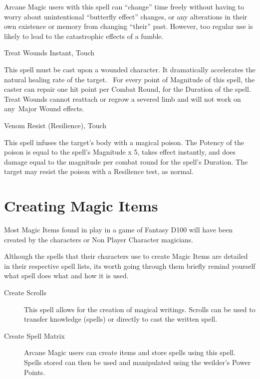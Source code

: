 \begin{samepage}
\begin{rpg-spell}
Arcane Magic users with this spell can “change” time freely without having to worry about unintentional “butterfly effect” changes, or any alterations in their own existence or memory from changing “their” past. However, too regular use is likely to lead to the catastrophic effects of a fumble.
\end{rpg-spell}
\end{samepage}


\begin{samepage}
\begin{rpg-spell}
{Treat Wounds}
{Instant, Touch}

This spell must be cast upon a wounded character. It dramatically accelerates the natural healing rate of the target.  For every point of Magnitude of this spell, the caster can repair one hit point per Combat Round, for the Duration of the spell. Treat Wounds cannot reattach or regrow a severed limb and will not work on any Major Wound effects. 
\end{rpg-spell}
\end{samepage}


\begin{samepage}
\begin{rpg-spell}
{Venom}
{Resist (Resilience), Touch}

This spell infuses the target’s body with a magical poison. The Potency of the poison is equal to the spell’s Magnitude x 5, takes effect instantly, and does damage equal to the magnitude per combat round for the spell’s Duration. The target may resist the poison with a Resilience test, as normal.
\end{rpg-spell}
\end{samepage}


\section{Creating Magic Items}
Most Magic Items found in play in a game of Fantasy D100 will have been created by the characters or Non Player Character magicians.

Although the spells that their characters use to create Magic Items are detailed in their respective spell lists, its worth going through them briefly remind yourself what spell does what and how it is used.

\begin{description}
\item [Create Scrolls] This spell allows for the creation of magical writings. Scrolls can be used to transfer knowledge (spells) or directly to cast the written spell.
\item [Create Spell Matrix] Arcane Magic users can create items and store spells using this spell. Spells stored can then be used and manipulated using the weilder's Power Points.
\end{description}


